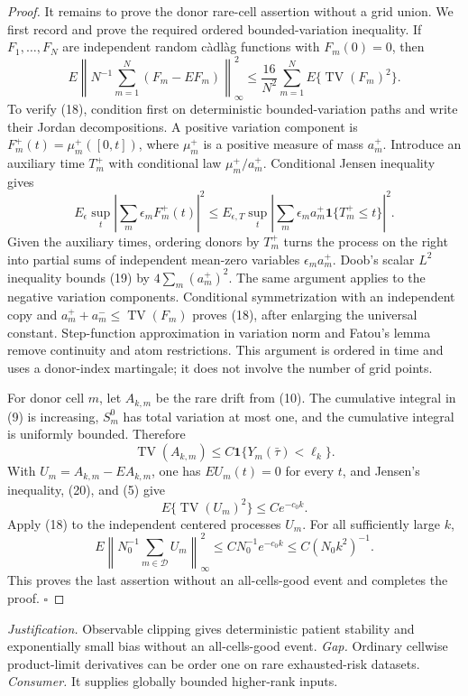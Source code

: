\documentclass{article}
\begin{document}
\begin{proof}
It remains to prove the donor rare-cell assertion without a grid union.  We
first record and prove the required ordered bounded-variation inequality.  If
\(F_1,\ldots,F_N\) are independent random c\`adl\`ag functions with
\(F_m(0)=0\), then
\[
 E\left\|N^{-1}\sum_{m=1}^N(F_m-EF_m)\right\|_\infty^2
 \leq \frac{16}{N^2}\sum_{m=1}^N
 E\{\operatorname{TV}(F_m)^2\}.                          \tag{18}
\]
To verify (18), condition first on deterministic bounded-variation paths and
write their Jordan decompositions.  A positive variation component is
\(F_m^+(t)=\mu_m^+([0,t])\), where \(\mu_m^+\) is a positive measure of
mass \(a_m^+\).  Introduce an auxiliary time \(T_m^+\) with conditional law
\(\mu_m^+/a_m^+\).  Conditional Jensen inequality gives
\[
 E_\epsilon\sup_t\left|\sum_m\epsilon_mF_m^+(t)\right|^2
 \leq E_{\epsilon,T}\sup_t
 \left|\sum_m\epsilon_ma_m^+\mathbf 1\{T_m^+\leq t\}\right|^2. \tag{19}
\]
Given the auxiliary times, ordering donors by \(T_m^+\) turns the process on
the right into partial sums of independent mean-zero variables
\(\epsilon_ma_m^+\).  Doob's scalar \(L^2\) inequality bounds (19) by
\(4\sum_m(a_m^+)^2\).  The same argument applies to the negative variation
components.  Conditional symmetrization with an independent copy and
\(a_m^++a_m^-\leq\operatorname{TV}(F_m)\) proves (18), after enlarging the
universal constant.  Step-function approximation in variation norm and Fatou's
lemma remove continuity and atom restrictions.  This argument is ordered in
time and uses a donor-index martingale; it does not involve the number of grid
points.

For donor cell \(m\), let \(A_{k,m}\) be the rare drift from (10).  The
cumulative integral in (9) is increasing, \(S_m^0\) has total variation at
most one, and the cumulative integral is uniformly bounded.  Therefore
\[
 \operatorname{TV}(A_{k,m})
 \leq C\mathbf 1\{Y_m(\bar\tau)<\ell_k\}.                \tag{20}
\]
With \(U_m=A_{k,m}-EA_{k,m}\), one has
\(EU_m(t)=0\) for every \(t\), and Jensen's inequality, (20), and (5) give
\[
 E\{\operatorname{TV}(U_m)^2\}\leq Ce^{-c_0k}.
\]
Apply (18) to the independent centered processes \(U_m\).  For all
sufficiently large \(k\),
\[
 E\left\|N_0^{-1}\sum_{m\in\mathcal D}U_m\right\|_\infty^2
 \leq CN_0^{-1}e^{-c_0k}
 \leq C(N_0k^2)^{-1}.                                    \tag{21}
\]
This proves the last assertion without an all-cells-good event and completes
the proof. \(\square\)
\end{proof}
\par\smallskip\noindent \textit{Justification.} Observable clipping gives deterministic patient stability and exponentially small bias without an all-cells-good event. \textit{Gap.} Ordinary cellwise product-limit derivatives can be order one on rare exhausted-risk datasets. \textit{Consumer.} It supplies globally bounded higher-rank inputs.
\end{document}
